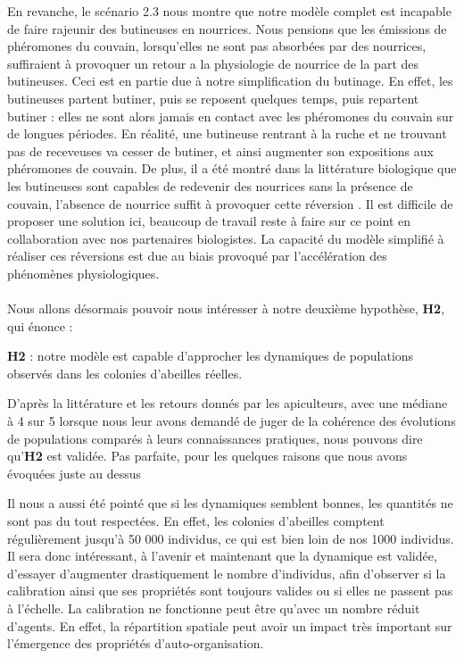 		 En revanche, le scénario 2.3 nous montre que notre modèle complet est incapable de faire rajeunir des butineuses en nourrices. Nous pensions que les émissions de phéromones du couvain, lorsqu'elles ne sont pas absorbées par des nourrices, suffiraient à provoquer un retour a la physiologie de nourrice de la part des butineuses. Ceci est en partie due à notre simplification du butinage. En effet, les butineuses partent butiner, puis se reposent quelques temps, puis repartent butiner : elles ne sont alors jamais en contact avec les phéromones du couvain sur de longues périodes. En réalité, une butineuse rentrant à la ruche et ne trouvant pas de receveuses va cesser de butiner, et ainsi augmenter son expositions aux phéromones de couvain. De plus, il a été montré dans la littérature biologique que les butineuses sont capables de redevenir des nourrices sans la présence de couvain, l'absence de nourrice suffit à provoquer cette réversion \cite{huang_regulation_1996}. Il est difficile de proposer une solution ici, beaucoup de travail reste à faire sur ce point en collaboration avec nos partenaires biologistes.
		 La capacité du modèle simplifié à réaliser ces réversions est due au biais provoqué par l'accélération des phénomènes physiologiques.
		
	\paragraph{}
		Nous allons désormais pouvoir nous intéresser à notre deuxième hypothèse, \textbf{H2}, qui énonce : 
		
		 \textbf{H2} : notre modèle est capable d'approcher les dynamiques de populations observés dans les colonies d'abeilles réelles.
		 
		 D'après la littérature et les retours donnés par les apiculteurs, avec une médiane à 4 sur 5 lorsque nous leur avons demandé de juger de la cohérence des évolutions de populations comparés à leurs connaissances pratiques, nous pouvons dire qu'\textbf{H2} est validée. Pas parfaite, pour les quelques raisons que nous avons évoquées juste au dessus	 
		 
		 Il nous a aussi été pointé que si les dynamiques semblent bonnes, les quantités ne sont pas du tout respectées. En effet, les colonies d'abeilles comptent régulièrement jusqu'à 50 000 individus, ce qui est bien loin de nos 1000 individus. Il sera donc intéressant, à l'avenir et maintenant que la dynamique est validée, d'essayer d'augmenter drastiquement le nombre d'individus, afin d'observer si la calibration ainsi que ses propriétés sont toujours valides ou si elles ne passent pas à l'échelle. La calibration ne fonctionne peut être qu'avec un nombre réduit d'agents. En effet, la répartition spatiale peut avoir un impact très important sur l'émergence des propriétés d'auto-organisation. 
		 
